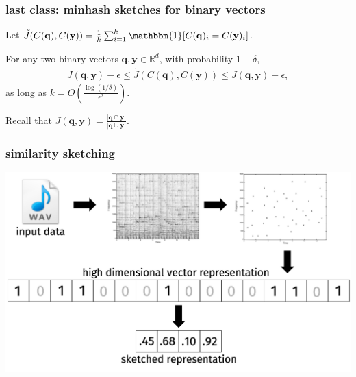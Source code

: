 \documentclass[compress]{beamer}
\newcommand{\bv}[1]{\mathbf{#1}}
\newcommand{\R}{\mathbb{R}}
\begin{document}
\begin{frame}[t]
	\frametitle{last class: minhash sketches for binary vectors}
	Let $\tilde{J}(C(\bv{q}), C(\bv{y})) = \frac{1}{k}\sum_{i=1}^k \mathbbm{1}[C(\bv{q})_i = C(\bv{y})_i]$. 
	
	\begin{lemma}
		For any two binary vectors $\bv{q}, \bv{y} \in \R^d$, with probability $1-\delta$,
		\begin{align*}
					J(\bv{q},\bv{y}) - \epsilon \leq \tilde{J}(C(\bv{q}), C(\bv{y})) \leq J(\bv{q},\bv{y}) + \epsilon,
		\end{align*}
	as long as $k = O\left(\frac{\log(1/\delta)}{\epsilon^2}\right)$. 
	\end{lemma}

Recall that $J(\bv{q},\bv{y}) = \frac{|\bv{q}\cap \bv{y}|}{|\bv{q}\cup \bv{y}|}$.
\end{frame}



\begin{frame}
	\frametitle{similarity sketching}
	\includegraphics[width=\textwidth]{sketch_paradigm.png}
\end{frame}
\end{document}
